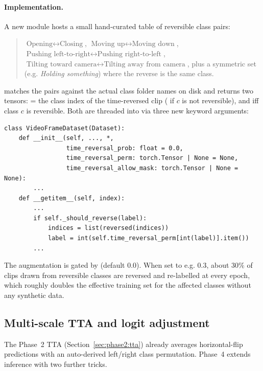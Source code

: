 \paragraph{Implementation.} A new module
 hosts a small
hand-curated table of reversible class pairs:
\begin{quote}
\(\text{Opening} \leftrightarrow \text{Closing}\),
\(\text{Moving up} \leftrightarrow \text{Moving down}\),
\(\text{Pushing left-to-right} \leftrightarrow
\text{Pushing right-to-left}\),
\(\text{Tilting toward camera} \leftrightarrow
\text{Tilting away from camera}\),
plus a symmetric set (e.g. \emph{Holding something}) where the reverse
is the same class.
\end{quote}
 matches the pairs against the
actual class folder names on disk and returns two tensors:
 = the class index of the time-reversed clip
( if \(c\) is not reversible), and
 iff class \(c\) is reversible. Both are
threaded into  via three new keyword
arguments:

\begin{lstlisting}[style=py]
class VideoFrameDataset(Dataset):
    def __init__(self, ..., *,
                 time_reversal_prob: float = 0.0,
                 time_reversal_perm: torch.Tensor | None = None,
                 time_reversal_allow_mask: torch.Tensor | None = None):
        ...
    def __getitem__(self, index):
        ...
        if self._should_reverse(label):
            indices = list(reversed(indices))
            label = int(self.time_reversal_perm[int(label)].item())
        ...
\end{lstlisting}

The augmentation is gated by 
(default \(0.0\)). When set to e.g. \(0.3\), about 30\% of clips drawn
from reversible classes are reversed and re-labelled at every epoch,
which roughly doubles the effective training set for the affected
classes without any synthetic data.

\subsection{Multi-scale TTA and logit adjustment}
\label{sec:tracka-phase4:tta}

The Phase~2 TTA (Section~\ref{sec:phase2:tta}) already averages
horizontal-flip predictions with an auto-derived left/right class
permutation. Phase~4 extends inference with two further tricks.

